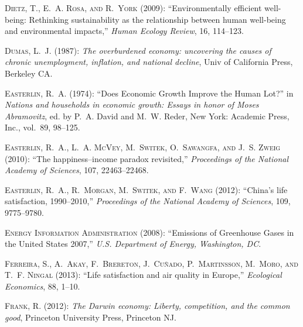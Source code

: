 \documentclass[10pt, letterpaper]{article}
\begin{document}
\begin{spacing}{1.5}
\begin{thebibliography}{52}
\textsc{Dietz, T., E.~A. Rosa, and R.~York} (2009): \enquote{Environmentally
  efficient well-being: Rethinking sustainability as the relationship between
  human well-being and environmental impacts,} \emph{Human Ecology Review}, 16,
  114--123.

\textsc{Dumas, L.~J.} (1987): \emph{The overburdened economy: uncovering the
  causes of chronic unemployment, inflation, and national decline}, Univ of
  California Press, Berkeley CA.

\textsc{Easterlin, R.~A.} (1974): \enquote{Does Economic Growth Improve the
  Human Lot?} in \emph{Nations and households in economic growth: Essays in
  honor of Moses Abramovitz}, ed. by P.~A. David and M.~W. Reder, New York:
  Academic Press, Inc., vol.~89, 98--125.

\textsc{Easterlin, R.~A., L.~A. McVey, M.~Switek, O.~Sawangfa, and J.~S. Zweig}
  (2010): \enquote{The happiness--income paradox revisited,} \emph{Proceedings
  of the National Academy of Sciences}, 107, 22463--22468.

\textsc{Easterlin, R.~A., R.~Morgan, M.~Switek, and F.~Wang} (2012):
  \enquote{China's life satisfaction, 1990--2010,} \emph{Proceedings of the
  National Academy of Sciences}, 109, 9775--9780.

\textsc{{Energy Information Administration}} (2008): \enquote{Emissions of
  Greenhouse Gases in the United States 2007,} \emph{U.S. Department of Energy,
  Washington, DC}.

\textsc{Ferreira, S., A.~Akay, F.~Brereton, J.~Cu{\~n}ado, P.~Martinsson,
  M.~Moro, and T.~F. Ningal} (2013): \enquote{Life satisfaction and air quality
  in Europe,} \emph{Ecological Economics}, 88, 1--10.

\textsc{Frank, R.} (2012): \emph{The Darwin economy: Liberty, competition, and
  the common good}, Princeton University Press, Princeton NJ.


\end{thebibliography}
\end{spacing}
\end{document}
